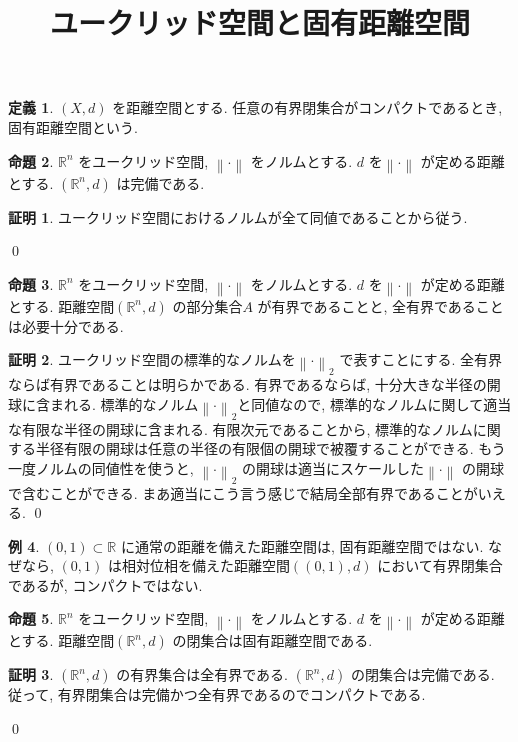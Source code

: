 \documentclass[10pt, fleqn, label-section=none]{bxjsarticle}
\title{ユークリッド空間と固有距離空間}
\date{}
\author{}
\theoremstyle{definition}
\newtheorem{dfn}{定義}[section]
\newtheorem{ex}[dfn]{例}
\newtheorem{prop}[dfn]{命題}
\newtheorem*{pf*}{証明}
\newcommand{\norm}[1]{\left\|#1\right\|}
\renewcommand{\;}{\, ; \,}
\begin{document}
\maketitle

\section{}


\begin{dfn}$(X, d)$ を距離空間とする. 任意の有界閉集合がコンパクトであるとき, 固有距離空間という. 

\end{dfn}



\begin{prop}$\mathbb R^n$ をユークリッド空間, $\norm{\cdot }$ をノルムとする. $d$ を$\norm \cdot$ が定める距離とする. $(\mathbb R^n, d)$ は完備である. 

\end{prop}
\begin{pf*}
ユークリッド空間におけるノルムが全て同値であることから従う. 

\qed
\end{pf*}

\begin{prop}$\mathbb R^n$ をユークリッド空間, $\norm{\cdot }$ をノルムとする. $d$ を$\norm \cdot$ が定める距離とする. 距離空間$(\mathbb R^n, d)$ の部分集合$A$ が有界であることと, 全有界であることは必要十分である. 

\end{prop}
\begin{pf*}ユークリッド空間の標準的なノルムを$\norm \cdot _2$ で表すことにする. 
全有界ならば有界であることは明らかである. 有界であるならば, 十分大きな半径の開球に含まれる. 標準的なノルム$\norm \cdot _2$と同値なので, 標準的なノルムに関して適当な有限な半径の開球に含まれる. 有限次元であることから, 標準的なノルムに関する半径有限の開球は任意の半径の有限個の開球で被覆することができる. もう一度ノルムの同値性を使うと, $\norm \cdot _2$ の開球は適当にスケールした$\norm \cdot$ の開球で含むことができる. まあ適当にこう言う感じで結局全部有界であることがいえる. 
\qed
\end{pf*}


\begin{ex}$(0, 1) \subset \mathbb R$ に通常の距離を備えた距離空間は, 固有距離空間ではない. なぜなら, $(0, 1)$ は相対位相を備えた距離空間$((0, 1), d)$ において有界閉集合であるが, コンパクトではない. 

\end{ex}


\begin{prop}$\mathbb R^n$ をユークリッド空間, $\norm{\cdot }$ をノルムとする. $d$ を$\norm \cdot$ が定める距離とする. 距離空間$(\mathbb R^n, d)$  の閉集合は固有距離空間である. 

\end{prop}
\begin{pf*}$(\mathbb R^n, d)$ の有界集合は全有界である. $(\mathbb R^n, d)$ の閉集合は完備である. 従って, 有界閉集合は完備かつ全有界であるのでコンパクトである. 

\qed
\end{pf*}
\end{document}
